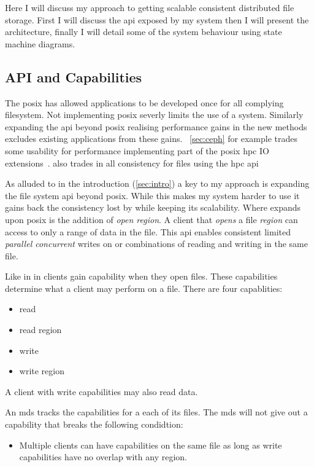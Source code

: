 Here I will discuss my approach to getting scalable consistent distributed file storage. First I will discuss the \ac{api} exposed by my system then I will present the architecture, finally I will detail some of the system behaviour using state machine diagrams.
%
\subsection{API and Capabilities}
The \ac{posix} has allowed applications to be developed once for all complying filesystem. Not implementing \ac{posix} severly limits the use of a system. Similarly expanding the \ac{api} beyond \ac{posix} realising performance gains in the new methods excludes existing applications from these gains. \ceph{}~\cref{sec:ceph} for example trades some usability for performance implementing part of the \ac{posix} \ac{hpc} IO extensions~\cite{hpc_posix}. \ceph{} also trades in all consistency for files using the \ac{hpc} \ac{api}

As alluded to in the introduction (\cref{sec:intro}) a key to my approach is expanding the file system \ac{api} beyond posix. While this makes my system harder to use it gains back the consistency lost by \ceph{} while keeping its scalability. Where \name{} expands upon \ac{posix} is the addition of \textsl{open region}. A client that \textit{opens} a file \textit{region} can access to only a range of data in the file. This \ac{api} enables consistent limited \emph{parallel concurrent} writes on or combinations of reading and writing in the same file.

Like in \ceph{} in \name{} clients gain capability when they open files. These capabilities determine what a client may perform on a file. There are four capablities: \nopagebreak
%
\begin{multicols}{4} %
\begin{itemize}
	\item read
	\item read region
	\item write
	\item write region
\end{itemize}
\end{multicols}
%
A client with write capabilities may also read data. 

\begin{samepage}
An \ac{mds} tracks the capabilities for a each of its files. The \ac{mds} will not give out a capability that breaks the following condidtion:
%
\begin{itemize}
	\item Multiple clients can have capabilities on the same file as long as write capabilities have no overlap with any region.
\end{itemize}
\end{samepage}
% 

